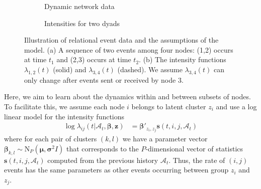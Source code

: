 \begin{figure}
\begin{subfigure}[b]{0.45\linewidth}
\centering
  \caption{Dynamic network data}
\end{subfigure}
\begin{subfigure}[b]{0.45\linewidth}
\centering
{}
\caption{Intensities for two dyads}
\end{subfigure}
\caption[]{Illustration of relational event data and the assumptions of the model.  (a) A sequence of two events among four nodes: (1,2) occurs at time $t_1$ and (2,3) occurs at time $t_2$. (b) The intensity functions $\lambda_{1,2}(t)$ (solid) and $\lambda_{3,4}(t)$ (dashed).  We assume $\lambda_{3,4}(t)$ can only change after events sent or received by node 3. }
\label{fig:example}
\end{figure}

Here, we aim to learn about the dynamics within and between subsets of nodes.   To facilitate this, we assume each node $i$ belongs to latent cluster $z_i$ and use a log linear model for the intensity functions
\begin{align*}
\log \lambda_{ij}(t | \mathcal{A}_t,\mathbf{\beta},\mathbf{z}) &= \boldsymbol{\beta}'_{z_i,z_j} \mathbf{s}(t,i,j,\mathcal{A}_t)
\end{align*}
where for each pair of clusters $(k,l)$ we have a parameter vector $\boldsymbol{\beta}_{k,l} \sim \mbox{N}_P(\boldsymbol{\mu},\boldsymbol{\sigma}^2I)$ that corresponds to the $P$-dimensional vector of statistics $\mathbf{s}(t,i,j,\mathcal{A}_t)$ computed from the previous history $\mathcal{A}_t$.
Thus, the rate of $(i,j)$ events has the same parameters as other events occurring between group $z_i$ and $z_j$.

